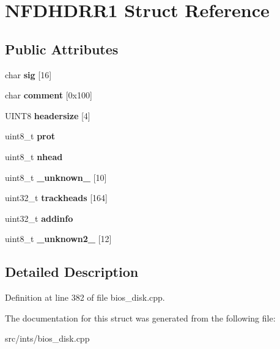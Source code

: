 \hypertarget{structNFDHDRR1}{\section{N\-F\-D\-H\-D\-R\-R1 Struct Reference}
\label{structNFDHDRR1}
}
\subsection*{Public Attributes}
\begin{DoxyCompactItemize}
\item 
\hypertarget{structNFDHDRR1_a88c7b4320bd3b63517da741c8acbdd26}{char {\bfseries sig} \mbox{[}16\mbox{]}}\label{structNFDHDRR1_a88c7b4320bd3b63517da741c8acbdd26}

\item 
\hypertarget{structNFDHDRR1_aac2dabcaf3225121f4ac747b638184e6}{char {\bfseries comment} \mbox{[}0x100\mbox{]}}\label{structNFDHDRR1_aac2dabcaf3225121f4ac747b638184e6}

\item 
\hypertarget{structNFDHDRR1_abe4da2c967610d416a133a6873827358}{U\-I\-N\-T8 {\bfseries headersize} \mbox{[}4\mbox{]}}\label{structNFDHDRR1_abe4da2c967610d416a133a6873827358}

\item 
\hypertarget{structNFDHDRR1_a25243b1e51b29f3d3b6d84f456b5ffd5}{uint8\-\_\-t {\bfseries prot}}\label{structNFDHDRR1_a25243b1e51b29f3d3b6d84f456b5ffd5}

\item 
\hypertarget{structNFDHDRR1_a7a989484ceb7866b317a05db688d8ad8}{uint8\-\_\-t {\bfseries nhead}}\label{structNFDHDRR1_a7a989484ceb7866b317a05db688d8ad8}

\item 
\hypertarget{structNFDHDRR1_a824fa111f184422b485041fa29d2775d}{uint8\-\_\-t {\bfseries \-\_\-unknown\-\_\-} \mbox{[}10\mbox{]}}\label{structNFDHDRR1_a824fa111f184422b485041fa29d2775d}

\item 
\hypertarget{structNFDHDRR1_aa033251a32e455d71aa6602d92c0aed1}{uint32\-\_\-t {\bfseries trackheads} \mbox{[}164\mbox{]}}\label{structNFDHDRR1_aa033251a32e455d71aa6602d92c0aed1}

\item 
\hypertarget{structNFDHDRR1_a6842fd4156f843a938c03367460b93ee}{uint32\-\_\-t {\bfseries addinfo}}\label{structNFDHDRR1_a6842fd4156f843a938c03367460b93ee}

\item 
\hypertarget{structNFDHDRR1_aa17d043d75862352c19ffb2667ea647b}{uint8\-\_\-t {\bfseries \-\_\-unknown2\-\_\-} \mbox{[}12\mbox{]}}\label{structNFDHDRR1_aa17d043d75862352c19ffb2667ea647b}

\end{DoxyCompactItemize}


\subsection{Detailed Description}


Definition at line 382 of file bios\-\_\-disk.\-cpp.



The documentation for this struct was generated from the following file\-:\begin{DoxyCompactItemize}
\item 
src/ints/bios\-\_\-disk.\-cpp\end{DoxyCompactItemize}
